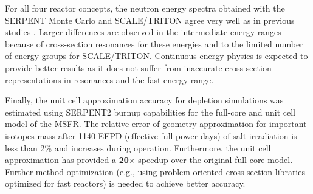 \documentclass[letterpaper]{mandc2019}
\begin{document}
For all four reactor concepts, the neutron energy spectra obtained with the SERPENT Monte Carlo and SCALE/TRITON agree very well as in previous studies \cite{betzler_fuel_2018}. 
Larger differences are observed in the intermediate energy ranges because of cross-section resonances for these energies and to the limited number of energy groups for SCALE/TRITON. 
Continuous-energy physics is expected to provide better results as it does not suffer from inaccurate cross-section representations in resonances and the fast energy range. 

Finally, the unit cell approximation accuracy for depletion simulations was estimated using SERPENT2 burnup capabilities for the full-core and unit cell model of the \gls{MSFR}. 
The relative error of geometry approximation for important isotopes mass after 1140 EFPD (effective full-power days) of salt irradiation is less than 2\% and increases during operation. 
Furthermore, the unit cell approximation has provided a \textbf{20$\times$} speedup over the original full-core model.
Further method optimization (e.g., using problem-oriented cross-section libraries optimized for fast reactors) is needed to achieve better accuracy.
\end{document}
